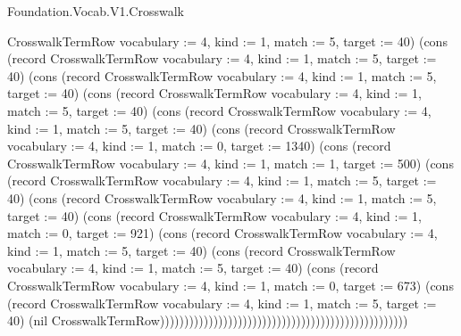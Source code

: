 \begin{lexlean}{Foundation.Vocab.V1.Crosswalk}
\begin{semanticmodule}
{CrosswalkTermRow {vocabulary := 4, kind := 1, match := 5, target := 40}) (cons (record CrosswalkTermRow {vocabulary := 4, kind := 1, match := 5, target := 40}) (cons (record CrosswalkTermRow {vocabulary := 4, kind := 1, match := 5, target := 40}) (cons (record CrosswalkTermRow {vocabulary := 4, kind := 1, match := 5, target := 40}) (cons (record CrosswalkTermRow {vocabulary := 4, kind := 1, match := 5, target := 40}) (cons (record CrosswalkTermRow {vocabulary := 4, kind := 1, match := 0, target := 1340}) (cons (record CrosswalkTermRow {vocabulary := 4, kind := 1, match := 1, target := 500}) (cons (record CrosswalkTermRow {vocabulary := 4, kind := 1, match := 5, target := 40}) (cons (record CrosswalkTermRow {vocabulary := 4, kind := 1, match := 5, target := 40}) (cons (record CrosswalkTermRow {vocabulary := 4, kind := 1, match := 0, target := 921}) (cons (record CrosswalkTermRow {vocabulary := 4, kind := 1, match := 5, target := 40}) (cons (record CrosswalkTermRow {vocabulary := 4, kind := 1, match := 5, target := 40}) (cons (record CrosswalkTermRow {vocabulary := 4, kind := 1, match := 0, target := 673}) (cons (record CrosswalkTermRow {vocabulary := 4, kind := 1, match := 5, target := 40}) (nil CrosswalkTermRow)))))))))))))))))))))))))))))))))))))))))))))))))))
}


\end{semanticmodule}
\end{lexlean}
